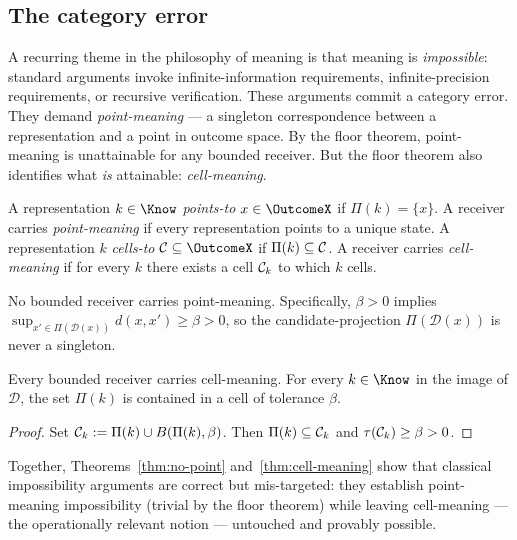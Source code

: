 \subsection{The category error}

A recurring theme in the philosophy of meaning is that meaning is
\emph{impossible}: standard arguments invoke infinite-information
requirements, infinite-precision requirements, or recursive verification.
These arguments commit a category error. They demand \emph{point-meaning}
--- a singleton correspondence between a representation and a point in
outcome space. By the floor theorem, point-meaning is unattainable for any
bounded receiver. But the floor theorem also identifies what \emph{is}
attainable: \emph{cell-meaning}.

\begin{definition}\label{def:meaning}
A representation $k\in\Know$ \emph{points-to} $x\in\OutcomeX$ if
$\Pi(k)=\{x\}$. A receiver carries \emph{point-meaning} if every
representation points to a unique state. A representation $k$
\emph{cells-to} $\Cell\subseteq\OutcomeX$ if $\Pi(k)\subseteq\mathcal{C}$.
A receiver carries \emph{cell-meaning} if for every $k$ there exists a cell
$\mathcal{C}_k$ to which $k$ cells.
\end{definition}

\begin{theorem}\label{thm:no-point}
No bounded receiver carries point-meaning. Specifically, $\beta>0$ implies
$\sup_{x'\in\Pi(\mathcal{D}(x))}d(x,x')\ge\beta>0$, so the
candidate-projection $\Pi(\mathcal{D}(x))$ is never a singleton.
\end{theorem}

\begin{theorem}\label{thm:cell-meaning}
Every bounded receiver carries cell-meaning. For every $k\in\Know$ in the
image of $\mathcal{D}$, the set $\Pi(k)$ is contained in a cell of
tolerance $\beta$.
\end{theorem}

\begin{proof}
Set $\mathcal{C}_k:=\Pi(k)\cup B(\Pi(k),\beta)$. Then $\Pi(k)\subseteq\mathcal{C}_k$
and $\tau(\mathcal{C}_k)\ge\beta>0$.
\end{proof}

Together, Theorems~\ref{thm:no-point} and~\ref{thm:cell-meaning} show that
classical impossibility arguments are correct but mis-targeted: they
establish point-meaning impossibility (trivial by the floor theorem) while
leaving cell-meaning --- the operationally relevant notion --- untouched and
provably possible.

